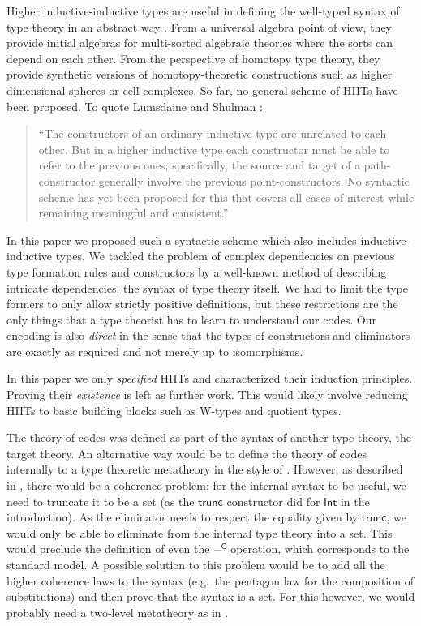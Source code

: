 \documentclass[dvipsnames]{lmcs} %
\newcommand{\blank}{\mathord{\hspace{1pt}\text{--}\hspace{1pt}}}
\newcommand{\C}{\mathsf{C}}
\newcommand{\1}{\mathsf{1}} \renewcommand{\Pr}{\mathsf{Pr}}
\newcommand{\Int}{\mathsf{Int}}
\theoremstyle{plain}\newtheorem{satz}[thm]{Satz} %
\begin{document}
Higher inductive-inductive types are useful in defining the well-typed
syntax of type theory in an abstract way \cite{ttintt}. From a
universal algebra point of view, they provide initial algebras for
multi-sorted algebraic theories where the sorts can depend on each
other. From the perspective of homotopy type theory, they provide
synthetic versions of homotopy-theoretic constructions such as higher
dimensional spheres or cell complexes. So far, no general scheme of
HIITs have been proposed. To quote Lumsdaine and Shulman
\cite{lumsdaineShulman}:
\begin{quotation}
``The constructors of an ordinary inductive type are unrelated to each
other.  But in a higher inductive type each constructor must be able
to refer to the previous ones; specifically, the source and target of
a path-constructor generally involve the previous
point-constructors. No syntactic scheme has yet been proposed for this
that covers all cases of interest while remaining meaningful and
consistent.''
\end{quotation}
In this paper we proposed such a syntactic scheme which also includes
inductive-inductive types. We tackled the problem of complex
dependencies on previous type formation rules and constructors by a
well-known method of describing intricate dependencies: the syntax of
type theory itself. We had to limit the type formers to only allow
strictly positive definitions, but these restrictions are the only
things that a type theorist has to learn to understand our codes. Our
encoding is also \emph{direct} in the sense that the types of
constructors and eliminators are exactly as required and not merely up
to isomorphisms.

In this paper we only \emph{specified} HIITs and characterized their
induction principles. Proving their \emph{existence} is left as
further work. This would likely involve reducing HIITs to basic
building blocks such as W-types and quotient types.

The theory of codes was defined as part of the syntax of another type
theory, the target theory. An alternative way would be to define
the theory of codes internally to a type theoretic metatheory in the
style of \cite{ttintt}. However, as described in \cite[Section
  6]{ttintt}, there would be a coherence problem: for the internal
syntax to be useful, we need to truncate it to be a set (as the
$\mathsf{trunc}$ constructor did for $\Int$ in the introduction). As
the eliminator needs to respect the equality given by
$\mathsf{trunc}$, we would only be able to eliminate from the internal
type theory into a set. This would preclude the definition of even the
$\blank^\C$ operation, which corresponds to the standard model. A
possible solution to this problem would be to add all the higher
coherence laws to the syntax (e.g.\ the pentagon law for the
composition of substitutions) and then prove that the syntax is a
set. For this however, we would probably need a two-level metatheory
as in \cite{semisegal}.
\end{document}
